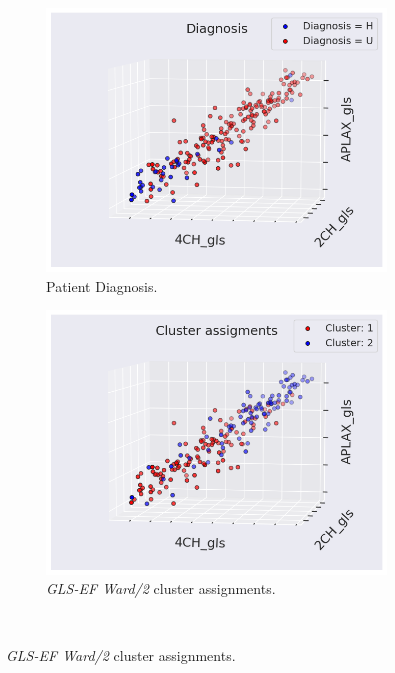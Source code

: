\begin{figure}[H]
    \centering
    \begin{subfigure}[b]{0.49\textwidth}
        \centering
        \includegraphics[width=0.99\textwidth]{results/pd/scatter_gls_indication_bin.png}
        \caption{Patient Diagnosis.}
        \label{fig:scatter_gls_ef_hf}
    \end{subfigure}
    \begin{subfigure}[b]{0.49\textwidth}
        \centering
        \includegraphics[width=0.99\textwidth]{results/pd/scatter_gls_EF_ward2.png}
        \caption{\textit{GLS-EF Ward/2} cluster assignments.}
        \label{fig:scatter_gls_ef_ward2}
    \end{subfigure}\\

\end{figure}
